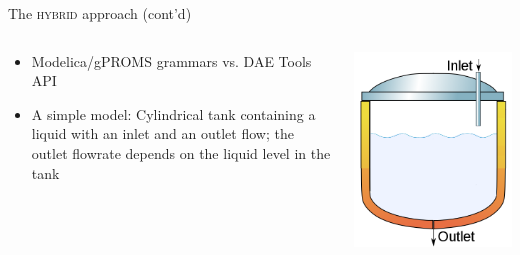 \documentclass[compress,newPxFont,sthlmFooter]{beamer}
\begin{document}
\begin{frame}[plain]{The \textsc{hybrid} approach (cont'd)}
    \begin{columns}[c]
      \begin{column}{0.7\paperwidth}
        {\small
         \begin{itemize}
            \item \textcolor{sthlmRed}{Modelica}/\textcolor{sthlmRed}{gPROMS} grammars vs. \textcolor{sthlmRed}{DAE Tools API} 
            \item A simple model: \newline
                    {\scriptsize
                        Cylindrical tank containing a liquid with an inlet and an outlet flow;  
                        the outlet flowrate depends on the liquid level in the tank
                    }
        \end{itemize}
        }
      \end{column}
      
      \begin{column}{0.3\paperwidth}
        \begin{center}
          \includegraphics[align=c, width=0.17\paperwidth]{buffer_tank.png}
        \end{center}
      \end{column}
    \end{columns}


\end{frame}
\end{document}
